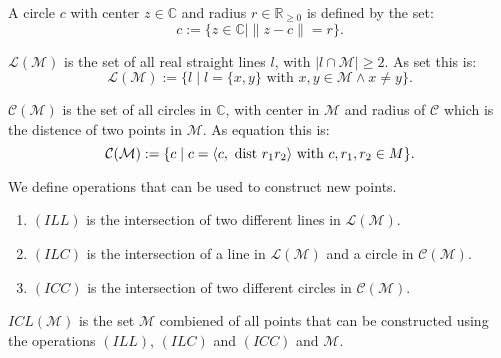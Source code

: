 \begin{definition}[Circle]
    \label{def:circle}
    \leanok
    A circle $c$ with center $z\in\mathbb{C}$ and radius $r\in\mathbb{R}_{\ge 0}$ is defined by the set: $$c:=\{z\in\mathbb{C} \mid\|z-c\|=r\}.$$
\end{definition}

\begin{definition}
    \label{def:set_of_lines}
    \leanok
    $\mathcal{L(M)}$ is the set of all real straight lines $l$, with $| l\cap \mathcal{M} |\ge 2$. As set this is:
    \begin{equation*}
        \mathcal{L(M)} := \{l \mid l = \{x,y\} \text{ with }x,y \in \mathcal{M} \land x \neq y\}.
    \end{equation*}
\end{definition}

\begin{definition}
    \label{def:set_of_circles}
    \leanok
    $\mathcal{C(M)}$ is the set of all circles in $\mathbb{C}$, with center in $\mathcal{M}$ and radius of $\mathcal{C}$ which is the distence of two points in $\mathcal{M}$. As equation this is:
    $$\mathcal{C(M)}:=\{c\mid c = \langle c, \text{ dist } r_1 r_2 \rangle \text{ with } c,r_1,r_2\in M\}.$$
\end{definition}

\begin{definition}
    \label{def:rules_to_constructed_a_point}
    \leanok
    We define operations that can be used to construct new points.
    \begin{enumerate}
        \item $(ILL)$ is the intersection of two different lines in $\mathcal{L(M)}$.
        \item $(ILC)$ is the intersection of a line in $\mathcal{L(M)}$ and a circle in $\mathcal{C(M)}$.
        \item $(ICC)$ is the intersection of two different circles in $\mathcal{C(M)}$.
    \end{enumerate}
    $ICL(\mathcal{M})$ is the set $\mathcal{M}$ combiened of all points that can be constructed using the operations $(ILL)$, $(ILC)$ and $(ICC)$ and $\mathcal{M}$.
\end{definition}

